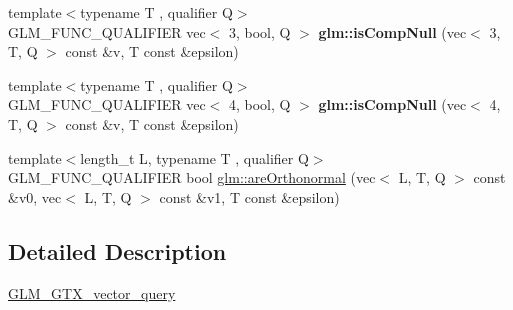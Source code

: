 \begin{DoxyCompactItemize}
\item 
\mbox{\label{vector__query_8inl_a3c5f0ad7464dde1b9daa5b5a9f3141ee}} 
{\footnotesize template$<$typename T , qualifier Q$>$ }\\G\+L\+M\+\_\+\+F\+U\+N\+C\+\_\+\+Q\+U\+A\+L\+I\+F\+I\+ER vec$<$ 3, bool, Q $>$ {\bfseries glm\+::is\+Comp\+Null} (vec$<$ 3, T, Q $>$ const \&v, T const \&epsilon)
\item 
\mbox{\label{vector__query_8inl_a7d5eb6f3d09e695f134999ae0b9e0aa9}} 
{\footnotesize template$<$typename T , qualifier Q$>$ }\\G\+L\+M\+\_\+\+F\+U\+N\+C\+\_\+\+Q\+U\+A\+L\+I\+F\+I\+ER vec$<$ 4, bool, Q $>$ {\bfseries glm\+::is\+Comp\+Null} (vec$<$ 4, T, Q $>$ const \&v, T const \&epsilon)
\item 
{\footnotesize template$<$length\+\_\+t L, typename T , qualifier Q$>$ }\\G\+L\+M\+\_\+\+F\+U\+N\+C\+\_\+\+Q\+U\+A\+L\+I\+F\+I\+ER bool \hyperlink{group__gtx__vector__query_ga1b091c3d7f9ee3b0708311c001c293e3}{glm\+::are\+Orthonormal} (vec$<$ L, T, Q $>$ const \&v0, vec$<$ L, T, Q $>$ const \&v1, T const \&epsilon)
\end{DoxyCompactItemize}


\subsection{Detailed Description}
\hyperlink{group__gtx__vector__query}{G\+L\+M\+\_\+\+G\+T\+X\+\_\+vector\+\_\+query} 